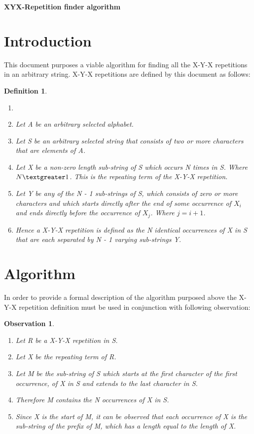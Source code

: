 \documentclass[12pt]{article}
\newtheorem{defn}{Definition}[section]
\newtheorem{obser}{Observation}[section]
\begin{document}
\begin{center}
	\LARGE\textbf{XYX-Repetition finder algorithm}
\end{center}

\newpage
\tableofcontents
\newpage
\section{Introduction}
This document purposes a viable algorithm for finding all the X-Y-X repetitions in an arbitrary string. X-Y-X repetitions are defined by this document as follows:\\
\begin{defn}
	\begin{enumerate}
		\item 
		\item Let A be an arbitrary selected alphabet.
		\item Let S be an arbitrary selected string that consists of two or more characters that are elements of A. 
		\item Let X be a non-zero length sub-string of S which occurs N times in S. Where $ N \textgreater 1 $. This is the repeating term of the X-Y-X repetition.		
		\item  Let Y be any of the N - 1 sub-strings of S, which consists of zero or more characters and which starts directly after the end of some occurrence of $X_{i}$ and ends directly before the occurrence of $X_{j}$. Where $j = i + 1$.
		\item Hence a X-Y-X repetition is defined as the N identical occurrences of X in S that are each separated by N - 1 varying sub-strings Y.	
	\end{enumerate}
\end{defn}
 


\section{Algorithm} 
In order to provide a formal description of the algorithm purposed above the X-Y-X repetition definition must be used in conjunction with following observation:
\begin{obser}
	\begin{enumerate}
		\item Let R be a X-Y-X repetition in S.
		\item Let X be the repeating term of R.
		\item Let M be the sub-string of S which starts at the first character of the first occurrence, of X in S and extends to the last character in S.
		\item Therefore M contains the N occurrences of X in S.
		\item Since X is the start of M, it can be observed that each occurrence of X is the sub-string of the prefix of M, which has a length equal to the length of X.
	\end{enumerate}
\end{obser}
\end{document}
